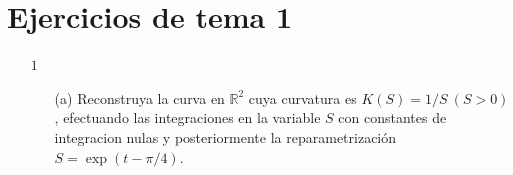 
\chapter*{Ejercicios de tema 1}
\large
\begin{enumerate}
    \item[$\boxed{1}$] 
    \begin{enumerate}
        \item[(a)] Reconstruya la curva en $\mathbb{R}^2$ cuya curvatura es $K(S)=1/S \ (S>0)$, efectuando las integraciones en la variable $S$ con constantes de integracion nulas  y posteriormente la reparametrización $S=\exp(t-\pi/4)$.\\
        

\end{enumerate}
\end{enumerate}

